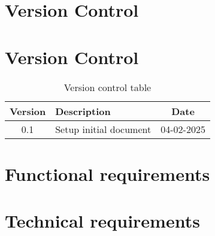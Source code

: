 \documentclass{article}
\begin{document}
\newpage

\section*{Version Control}

\section*{Version Control}
\begin{table}[H]
    \begin{center}
        \begin{tabular}{|c|l|c|}
            \hline
            Version & Description & Date \\
            \hline
            0.1 & Setup initial document & 04-02-2025 \\
            \hline
        \end{tabular}
        \caption{Version control table}
    \end{center}
\end{table}

\newpage

\tableofcontents
\newpage
\section{Functional requirements}
\section{Technical requirements}
\end{document}
